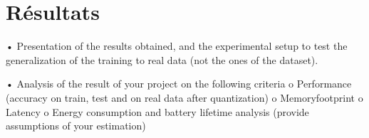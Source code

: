 \chapter{Résultats}

• Presentation of the results obtained, and the experimental setup to test the generalization of
the training to real data (not the ones of the dataset).

• Analysis of the result of your project on the following criteria
o Performance (accuracy on train, test and on real data after quantization)
o Memoryfootprint
o Latency
o Energy consumption and battery lifetime analysis (provide assumptions of your
estimation)

